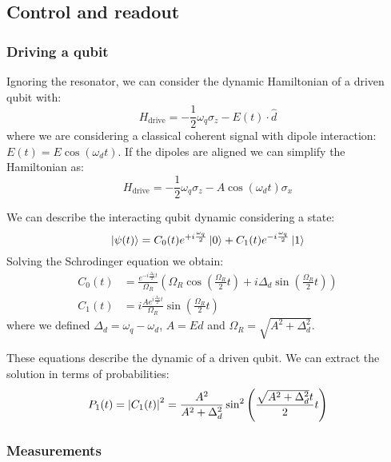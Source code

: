 
\subsection{Control and readout}

\subsubsection{Driving a qubit}

Ignoring the resonator, we can consider the dynamic Hamiltonian of a driven qubit with:
\begin{equation}
    H_{\text{drive}} = -\frac{1}{2}\omega_q \sigma_z - E(t) \cdot \hat d 
\end{equation}
where we are considering a classical coherent signal with dipole interaction: $E(t)=E\cos(\omega_d t)$.
If the dipoles are aligned we can simplify  the Hamiltonian as:
\begin{equation}\label{eq:drive_hamiltonian}
    H_{\text{drive}} = -\frac{1}{2}\omega_q \sigma_z - A\cos(\omega_d t) \sigma_x
\end{equation}

We can describe the interacting qubit dynamic considering a state:
\begin{equation}
    \ket{\psi(t)} = C_0 (t) e^{+i\frac{\omega_q}{2}}\ket 0 + C_1 (t) e^{-i\frac{\omega_q}{2}}\ket 1
\end{equation}
Solving the Schrodinger equation we obtain:
\begin{align}
    C_0(t) &= \frac{e^{-i\frac{\Delta_d}{2}t}}{\Omega_R}\left(  \Omega_R \cos\left( \frac{\Omega_R}{2}t \right) + i \Delta_d \sin \left( \frac{\Omega_R}{2}t \right) \right)\\
    C_1(t) &= i \frac{Ae^{i\frac{\Delta_d}{2}t}}{\Omega_R}\sin \left( \frac{\Omega_R}{2}t \right)
\end{align}
where we defined $\Delta_d = \omega_q - \omega_d$, $A=Ed$ and $\Omega_R=\sqrt{A^2+\Delta^2_d}$.

These equations describe the dynamic of a driven qubit.
We can extract the solution in terms of probabilities:
\begin{equation}\label{eq:probability_1}
    P_1(t) = \abs{C_1(t)}^2= \frac{A^2}{A^2 + \Delta_d^2}\sin^2\left( \frac{\sqrt{A^2+\Delta_d^2}t}{2}t\right)
\end{equation}

\subsubsection{Measurements}

